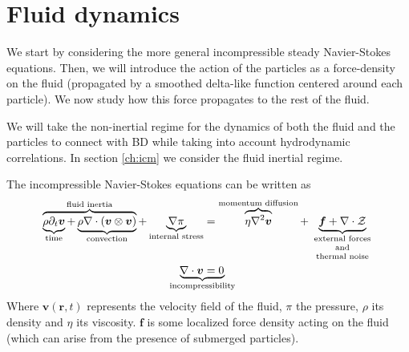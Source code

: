 \documentclass[ twoside,openright,titlepage,numbers=noenddot,%
headinclude,footinclude,cleardoublepage=empty,abstract=on,
BCOR=5mm,paper=b5,fontsize=11pt, dvipsnames
]{scrreprt}
\renewcommand{\vec}[1]{\bm{#1}}
\newcommand{\fpos}{r}
\newcommand{\fvel}{v}
\begin{document}
\section*{Fluid dynamics}
We start by considering the more general incompressible steady Navier-Stokes equations. Then, we will introduce the action of the particles as a force-density on the fluid (propagated by a smoothed delta-like function centered around each particle). We now study how this force propagates to the rest of the fluid.

We will take the non-inertial regime for the dynamics of both the fluid and the particles to connect with \gls{BD} while taking into account hydrodynamic correlations. In section \ref{ch:icm} we consider the fluid inertial regime.

The incompressible Navier-Stokes equations can be written as~\cite{Balboa2014}
\begin{equation}
  \label{eq:navierstokes}
  \begin{aligned}
    \overbrace{\underbrace{\rho\partial_t{\vec{\fvel}}}_{\text{time}} +\underbrace{\rho\nabla\cdot (\vec{\fvel}\otimes\vec{\fvel})}_{\text{convection}}}^{\text{fluid inertia}} + \underbrace{\nabla \pi}_{\text{internal stress}} &= \overbrace{\eta \nabla^2\vec{\fvel}}^{\text{momentum diffusion}} + \underbrace{\vec{f} + \nabla\cdot \mathcal{Z}}_{\text{\parbox{2cm}{\centering external forces\\[-4pt] and\\[-4pt] thermal noise}}}\\
    \nabla\cdot\vec{\fvel} &= 0\quad\mathllap{\underbrace{\phantom{\nabla\cdot\vec{\fvel} = 0}}_{\text{incompressibility}}}
  \end{aligned}
\end{equation}
Where $\vec{\fvel}(\vec{\fpos}, t)$ represents the velocity field of the fluid, $\pi$ the pressure, $\rho$ its density and $\eta$ its viscosity. $\vec{f}$ is some localized force density acting on the fluid (which can arise from the presence of submerged particles).
\end{document}
